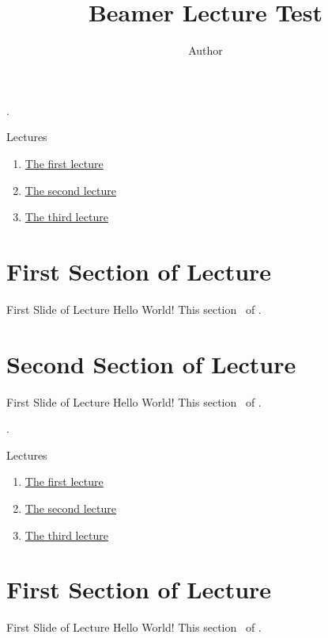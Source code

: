 \documentclass[
	aspectratio=169, %
	8pt, %
]{beamer}
\title{Beamer Lecture Test}
\author{Author}
\newcommand{\lectureoverviewslide}{
    \begin{frame}[plain]{\thelecture.~\insertlecture}
        \label{lec:\thelecture}
        \begin{fancycolumns}
            \begin{definition}{Lectures}
                \begin{enumerate}
                    \item \hyperlink{lec:1}{The first lecture}
                    \item \hyperlink{lec:2}{The second lecture}
                    \item \hyperlink{lec:3}{The third lecture}
                \end{enumerate}
            \end{definition}
        \nextcolumn
            \tableofcontents
        \end{fancycolumns}
    \end{frame}
}
\begin{document}
    \maketitle



    \maketitle
    
    \lectureoverviewslide

    \section{First Section of Lecture \thelecture}

    \begin{frame}{First Slide of Lecture \thelecture}
        Hello World! This section \thesection\ of \insertlecture.
    \end{frame}

    \section{Second Section of Lecture \thelecture}

    \begin{frame}{First Slide of Lecture \thelecture}
        Hello World! This section \thesection\ of \insertlecture.
    \end{frame}





    \lectureoverviewslide

    \section{First Section of Lecture \thelecture}

    \begin{frame}{First Slide of Lecture \thelecture}
        Hello World! This section \thesection\ of \insertlecture.
    \end{frame}
\end{document}
